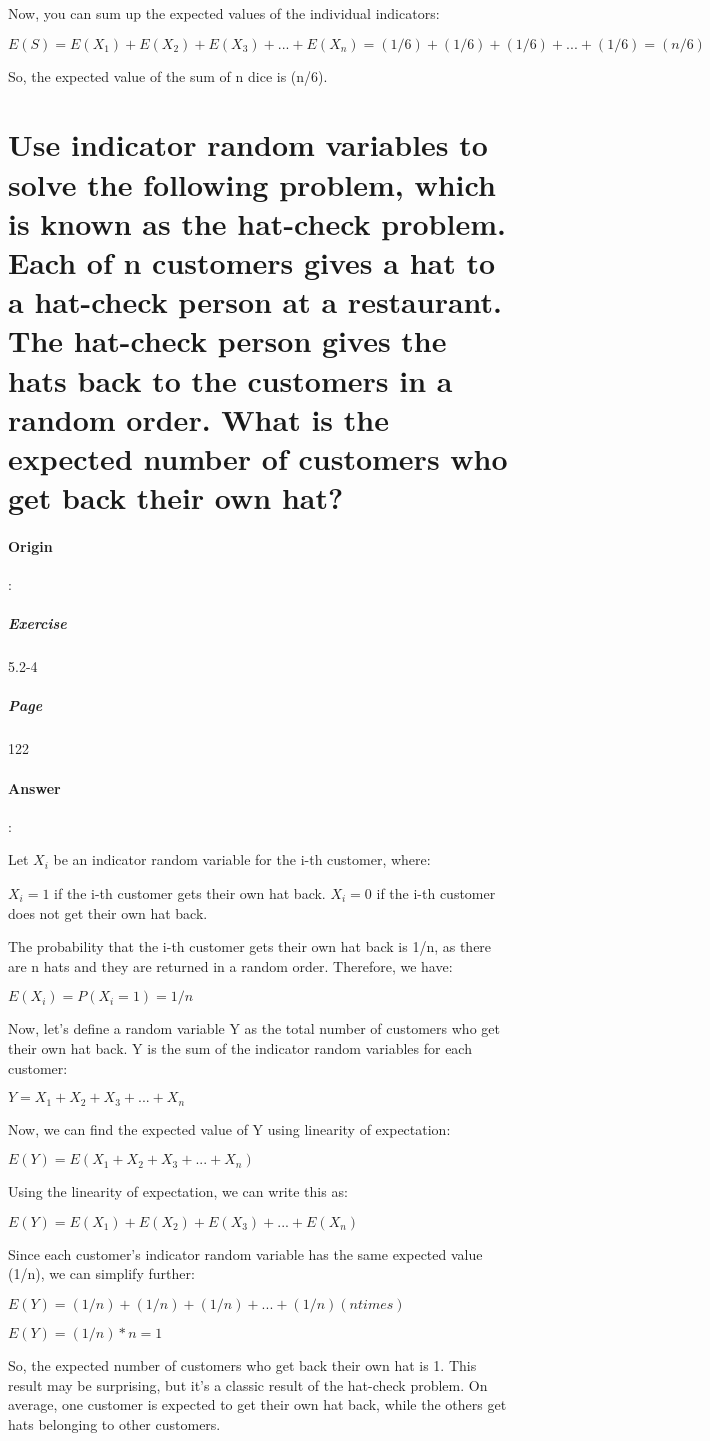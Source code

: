 \documentclass{article}
\begin{document}
Now, you can sum up the expected values of the individual indicators:

$ E(S) = E(X_1) + E(X_2) + E(X_3) + ... + E(X_n) = (1/6) + (1/6) + (1/6) + ... + (1/6) = (n/6) $

So, the expected value of the sum of n dice is (n/6).



  \section{Use indicator random variables to solve the following problem, which is known as the hat-check problem. Each of n customers gives a hat to a hat-check person at a restaurant. The hat-check person gives the hats back to the customers in a random order. What is the expected number of customers who get back their own hat?}

  \paragraph{Origin}:
    \subparagraph{Exercise}5.2-4
    \subparagraph{Page}122
  \paragraph{Answer}:

  Let $X_i$ be an indicator random variable for the i-th customer, where:

  $X_i = 1$ if the i-th customer gets their own hat back.
  $X_i = 0$ if the i-th customer does not get their own hat back.
  
  The probability that the i-th customer gets their own hat back is 1/n, as there are n hats and they are returned in a random order. Therefore, we have:
  
  $E(X_i) = P(X_i = 1) = 1/n$
  
  Now, let's define a random variable Y as the total number of customers who get their own hat back. Y is the sum of the indicator random variables for each customer:
  
  $Y = X_1 + X_2 + X_3 + ... + X_n$
  
  Now, we can find the expected value of Y using linearity of expectation:
  
  $E(Y) = E(X_1 + X_2 + X_3 + ... + X_n)$
  
  Using the linearity of expectation, we can write this as:
  
  $E(Y) = E(X_1) + E(X_2) + E(X_3) + ... + E(X_n)$
  
  Since each customer's indicator random variable has the same expected value (1/n), we can simplify further:
  
  $E(Y) = (1/n) + (1/n) + (1/n) + ... + (1/n) (n times)$
  
  $E(Y) = (1/n) * n = 1$
  
  So, the expected number of customers who get back their own hat is 1. This result may be surprising, but it's a classic result of the hat-check problem. On average, one customer is expected to get their own hat back, while the others get hats belonging to other customers.
\end{document}
